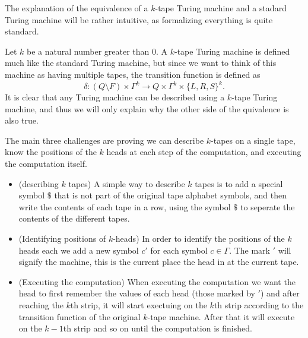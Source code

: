\documentclass[11pt,a4paper]{article}
\begin{document}
  \begin{example}
    The explanation of the equivalence of a $k$-tape Turing machine and
    a stadard Turing machine will be rather intuitive, as formalizing
    everything is quite standard.

    Let $k$ be a natural number greater than $0$.
    A $k$-tape Turing machine is defined much like the standard Turing
    machine, but since we want to think of this machine as having
    multiple tapes, the transition function is defined as
    \[
      \delta \colon (Q \setminus F) \times \Gamma^k \to
      Q \times \Gamma^k \times \{L, R, S\}^k.
    \]
    It is clear that any Turing machine can be described using a $k$-tape
    Turing machine, and thus we will only explain why the other side of
    the quivalence is also true.

    The main three challenges are proving we can describe $k$-tapes
    on a single tape, know the positions of the $k$ heads at each step
    of the computation, and executing the computation itself.
    \begin{itemize}
      \item (describing $k$ tapes) A simple way to describe $k$ tapes
        is to add a special symbol $\$$ that is not part of the original
        tape alphabet symbols, and then write the contents of each tape
        in a row, using the symbol $\$$ to seperate the contents of the
        different tapes.
      \item (Identifying positions of $k$-heads) In order to identify the 
        positions of the $k$ heads each we add a new symbol $c'$ for each
        symbol $c \in \Gamma$. The mark $'$ will signify the machine, this
        is the current place the head in at the current tape.
      \item (Executing the computation) When executing the computation we
        want the head to first remember the values of each head (those marked
        by $'$) and after reaching the $k$th strip, it will start exectuing
        on the $k$th strip according to the transition function of the
        original $k$-tape machine. After that it will execute on the
        $k-1$th strip and so on until the computation is finished.
    \end{itemize}
  \end{example}

  \begin{example}[]
  \end{example}
\end{document}

